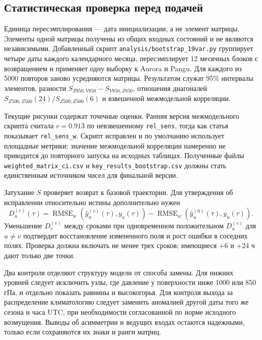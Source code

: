 \documentclass{article}
\newcommand{\rmse}{\operatorname{RMSE}}
\begin{document}
\subsection{Статистическая проверка перед подачей}
\label{app:statistics}

Единица пересэмплирования --- дата инициализации, а не элемент матрицы. Элементы одной матрицы получены из общих входных состояний и не являются независимыми. Добавленный скрипт \texttt{analysis/bootstrap\_19var.py} группирует четыре даты каждого календарного месяца, пересэмплирует 12 месячных блоков с возвращением и применяет одну выборку к Aurora и Pangu. Для каждого из 5000 повторов заново усредняются матрицы. Результатом служат 95\% интервалы элементов, разности $S_{Z850,V850}-S_{V850,Z850}$, отношения диагоналей $S_{Z500,Z500}(24)/S_{Z500,Z500}(6)$ и взвешенной межмодельной корреляции.

Текущие рисунки содержат точечные оценки. Ранняя версия межмодельного скрипта считала $r=0.913$ по невзвешенному \texttt{rel\_sens}, тогда как статья показывает \texttt{rel\_sens\_w}. Скрипт исправлен и по умолчанию использует площадные метрики; значение межмодельной корреляции намеренно не приводится до повторного запуска на исходных таблицах. Полученные файлы \texttt{weighted\_matrix\_ci.csv} и \texttt{key\_results\_bootstrap.csv} должны стать единственным источником чисел для финальной версии.

Затухание $S$ проверяет возврат к базовой траектории. Для утверждения об исправлении относительно истины дополнительно нужен
\begin{equation}
D_u^{(v)}(\tau)=\rmse_w(\hat y_u^{(v)}(\tau),y_u(\tau))-\rmse_w(\hat y_u^{(0)}(\tau),y_u(\tau)).
\end{equation}
Уменьшение $D_v^{(v)}$ между сроками при одновременном положительном $D_u^{(v)}$ для $u\ne v$ подтвердит восстановление измененного поля и рост ошибки в соседних полях. Проверка должна включать не менее трех сроков; имеющиеся +6 и +24 ч дают только две точки.

Два контроля отделяют структуру модели от способа замены. Для нижних уровней следует исключить узлы, где давление у поверхности ниже 1000 или 850 гПа, и отдельно показать равнины и высокогорья. Для контроля выхода за распределение климатологию следует заменить аномалией другой даты того же сезона и часа UTC, при необходимости согласованной по норме исходного возмущения. Выводы об асимметрии и ведущих входах остаются надежными, только если сохраняются их знаки и ранги матриц.
\end{document}
